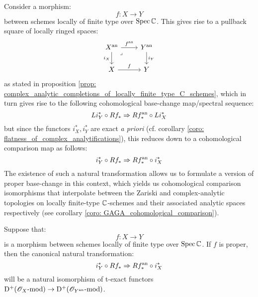             \begin{remark}
                Consider a morphism:
                    $$f: X \to Y$$
                between schemes locally of finite type over $\operatorname{Spec} \mathbb{C}$. This gives rise to a pullback square of locally ringed spaces:
                    $$
                        \begin{tikzcd}
                    	{X^{\an}} & {Y^{\an}} \\
                    	X & Y
                    	\arrow["{f^{\an}}", from=1-1, to=1-2]
                    	\arrow["f", from=2-1, to=2-2]
                    	\arrow["{i_X}"', from=1-1, to=2-1]
                    	\arrow["{i_Y}", from=1-2, to=2-2]
                    	\arrow["\lrcorner"{anchor=center, pos=0.125}, draw=none, from=1-1, to=2-2]
                        \end{tikzcd}
                    $$
                as stated in proposition \ref{prop: complex_analytic_completions_of_locally_finite_type_C_schemes}, which in turn gives rise to the following cohomological base-change map/spectral sequence:
                    $$Li_Y^* \circ R f_* \Rightarrow R f^{\mathrm{an}}_* \circ Li_X^*$$
                but since the functors $i_X^*, i_Y^*$ are exact \textit{a priori} (cf. corollary \ref{coro: flatness_of_complex_analytifications}), this reduces down to a cohomological comparison map as follows:
                    $$i_Y^* \circ R f_* \Rightarrow R f^{\mathrm{an}}_* \circ i_X^*$$
                The existence of such a natural transformation allows us to formulate a version of proper base-change in this context, which yields us cohomological comparison isomorphisms that interpolate between the Zariski and complex-analytic topologies on locally finite-type $\mathbb{C}$-schemes and their associated analytic spaces respectively (see corollary \ref{coro: GAGA_cohomological_comparison}). 
            \end{remark}
            \begin{theorem} \label{theorem: relative_analytification_of_sheaves_of_modules}
                Suppose that:
                    $$f: X \to Y$$
                is a morphism between schemes locally of finite type over $\operatorname{Spec} \mathbb{C}$. If $f$ is proper, then the canonical natural transformation:
                    $$i_Y^* \circ R f_* \Rightarrow R f^{\mathrm{an}}_* \circ i_X^*$$
                will be a natural isomorphism of t-exact functors $\mathrm{D}^+(\mathscr{O}_X\text{-}\mathrm{mod}) \to \mathrm{D}^+(\mathscr{O}_{Y^{\mathrm{an}}}\text{-}\mathrm{mod})$.
            \end{theorem}
